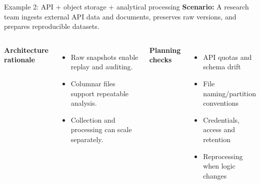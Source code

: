 \documentclass[aspectratio=43,10pt]{beamer}
\begin{document}
\begin{frame}{Example 2: API + object storage + analytical processing}
\textbf{Scenario:} A research team ingests external API data and documents, preserves raw versions, and prepares reproducible datasets.
\vspace{.5em}
\centering
{}
\vspace{-1em}
\begin{columns}[T]
\textbf{Architecture rationale}
\begin{itemize}\item Raw snapshots enable replay and auditing.\item Columnar files support repeatable analysis.\item Collection and processing can scale separately.\end{itemize}
\textbf{Planning checks}
\begin{itemize}\item API quotas and schema drift\item File naming/partition conventions\item Credentials, access and retention\item Reprocessing when logic changes\end{itemize}
\end{columns}
\end{frame}
\end{document}

